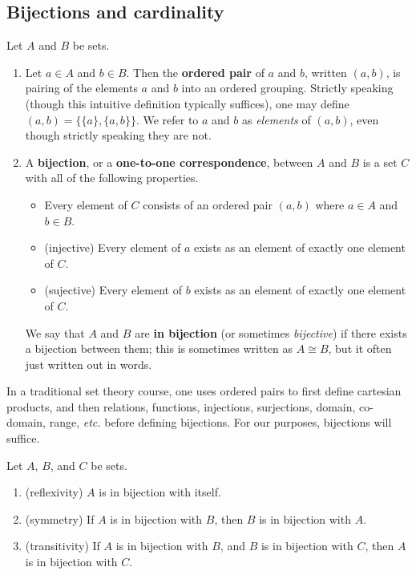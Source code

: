\subsection{Bijections and cardinality}
\begin{definition} Let $A$ and $B$ be sets.
\begin{enumerate}
    \item Let $a\in A$ and $b\in B$.  Then the \textbf{ordered pair} of $a$ and $b$, written $(a, b)$, is pairing of the elements $a$ and $b$ into an ordered grouping.  Strictly speaking (though this intuitive definition typically suffices), one may define $(a, b)=\{\{a\}, \{a, b\}\}$.  We refer to $a$ and $b$ as \textit{elements} of $(a,b)$, even though strictly speaking they are not.
    \item A \textbf{bijection}, or a \textbf{one-to-one correspondence}, between $A$ and $B$ is a set $C$ with all of the following properties.
    \begin{itemize}
        \item Every element of $C$ consists of an ordered pair $(a,b)$ where $a \in A$ and $b \in B$.
        \item (injective) Every element of $a$ exists as an element of exactly one element of $C$.
        \item (sujective) Every element of $b$ exists as an element of exactly one element of $C$.
    \end{itemize}
    We say that $A$ and $B$ are \textbf{in bijection} (or sometimes \textit{bijective}) if there exists a bijection between them; this is sometimes written as $A \cong B$, but it often just written out in words.
\end{enumerate}
\end{definition}

\begin{remark} In a traditional set theory course, one uses ordered pairs to first define cartesian products, and then relations, functions, injections, surjections, domain, co-domain, range, \textit{etc.} before defining bijections. For our purposes, bijections will suffice.
\end{remark}

\begin{theorem} Let $A$, $B$, and $C$ be sets.
\begin{enumerate}
    \item (reflexivity) $A$ is in bijection with itself.
    \item (symmetry) If $A$ is in bijection with $B$, then $B$ is in bijection with $A$.
    \item (transitivity) If $A$ is in bijection with $B$, and $B$ is in bijection with $C$, then $A$ is in bijection with $C$.
\end{enumerate}\end{theorem}

